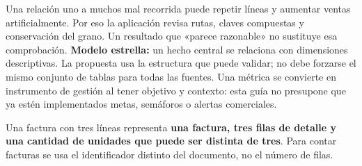 Una relación uno a muchos mal recorrida puede repetir líneas y aumentar ventas artificialmente. Por eso la aplicación revisa rutas, claves compuestas y conservación del grano. Un resultado que «parece razonable» no sustituye esa comprobación.
\textbf{Modelo estrella:} un hecho central se relaciona con dimensiones descriptivas. La propuesta usa la estructura que puede validar; no debe forzarse el mismo conjunto de tablas para todas las fuentes. Una métrica se convierte en instrumento de gestión al tener objetivo y contexto: esta guía no presupone que ya estén implementados metas, semáforos o alertas comerciales.
\begin{good}
Una factura con tres líneas representa \textbf{una factura, tres filas de detalle y una cantidad de unidades que puede ser distinta de tres}. Para contar facturas se usa el identificador distinto del documento, no el número de filas.
\end{good}

